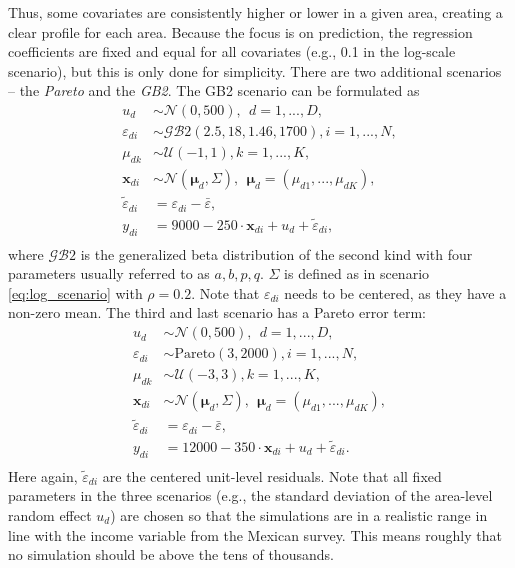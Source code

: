 Thus, some covariates are consistently higher or lower in a given area, creating a clear profile for each area.
Because the focus is on prediction, the regression coefficients are fixed and equal for all covariates (e.g., 0.1 in the log-scale scenario), but this is only done for simplicity.
There are two additional scenarios – the \textit{Pareto} and the \textit{GB2}.
The GB2 scenario can be formulated as
\begin{equation}
    \begin{split}
        u_d & \sim \mathcal N(0, 500), ~~ d = 1,...,D,\\
        \varepsilon_{di} & \sim \mathcal{GB}2(2.5, 18, 1.46, 1700), i = 1,...,N,\\
        \mu_{dk} & \sim \mathcal{U}(-1, 1), k = 1,...,K,\\
        \boldsymbol x_{di}  &\sim  \mathcal N  (\boldsymbol \mu_{d}, \Sigma) ,
        ~~ \boldsymbol \mu_{d} = (\mu_{d1}, ..., \mu_{dK}),\\
        \tilde{\varepsilon}_{di} & = \varepsilon_{di} - \bar \varepsilon,  \\
        y_{di} & = 9000 - 250 \cdot \boldsymbol x_{di} + u_d + \tilde \varepsilon_{di}, \\
    \end{split}
    \label{eq:gb2_scenario}
\end{equation}
where $\mathcal{GB}2$ is the generalized beta distribution of the second kind with four parameters usually referred to as $a, b, p, q$. $\Sigma$ is defined as in scenario \ref{eq:log_scenario} with $\rho = 0.2$. Note that $\varepsilon_{di}$ needs to be centered, as they have a non-zero mean. The third and last scenario has a Pareto error term:
\begin{equation}
    \begin{split}
        u_d & \sim \mathcal N(0, 500), ~~ d = 1,...,D,\\
        \varepsilon_{di} & \sim \text{Pareto}(3, 2000), i = 1,...,N,\\
        \mu_{dk} & \sim \mathcal{U}(-3, 3), k = 1,...,K,\\
        \boldsymbol x_{di}  &\sim  \mathcal N (\boldsymbol \mu_{d}, \Sigma) ,
        ~~ \boldsymbol \mu_{d} = (\mu_{d1}, ..., \mu_{dK}),\\
        \tilde{\varepsilon}_{di} & = \varepsilon_{di} - \bar \varepsilon,  \\
        y_{di} & = 12000 - 350 \cdot \boldsymbol x_{di}    + u_d + \tilde \varepsilon_{di}.\\
    \end{split}
    \label{eq:pareto_scenario}
\end{equation}
Here again, $\tilde \varepsilon_{di}$ are the centered unit-level residuals.
Note that all fixed parameters in the three scenarios (e.g., the standard deviation of the area-level random effect $u_d$) are chosen so that the simulations are in a realistic range in line with the income variable  from the Mexican survey.
This means roughly that no simulation should be above the tens of thousands.

